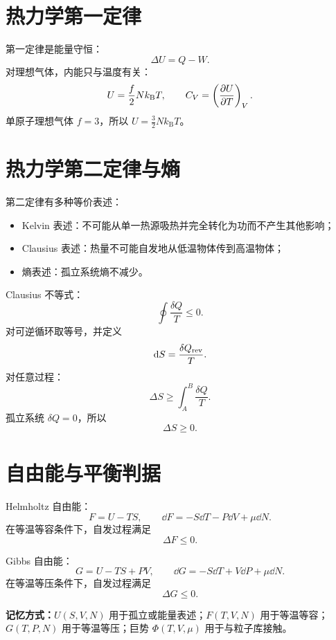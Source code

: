 \section{热力学第一定律}

第一定律是能量守恒：
\[
  \Delta U = Q-W .
\]
对理想气体，内能只与温度有关：
\[
  U = \frac{f}{2}Nk_{\mathrm B}T,\qquad C_V=\left(\frac{\partial U}{\partial T}\right)_{V}.
\]
单原子理想气体 $f=3$，所以 $U=\frac{3}{2}Nk_{\mathrm B}T$。

\section{热力学第二定律与熵}

第二定律有多种等价表述：
\begin{itemize}
  \item Kelvin 表述：不可能从单一热源吸热并完全转化为功而不产生其他影响；
  \item Clausius 表述：热量不可能自发地从低温物体传到高温物体；
  \item 熵表述：孤立系统熵不减少。
\end{itemize}

Clausius 不等式：
\[
  \oint \frac{\delta Q}{T}\le 0 .
\]
对可逆循环取等号，并定义
\[
  \mathrm{d} S = \frac{\delta Q_{\rm rev}}{T}.
\]
对任意过程：
\[
  \Delta S \ge \int_A^B\frac{\delta Q}{T}.
\]
孤立系统 $\delta Q=0$，所以
\[
  \Delta S\ge 0 .
\]

\section{自由能与平衡判据}

Helmholtz 自由能：
\[
  F = U-TS,\qquad \dd F=-S\dd T-P\dd V+\mu\dd N .
\]
在等温等容条件下，自发过程满足
\[
  \Delta F\le 0.
\]

Gibbs 自由能：
\[
  G = U-TS+PV,\qquad \dd G=-S\dd T+V\dd P+\mu\dd N .
\]
在等温等压条件下，自发过程满足
\[
  \Delta G\le 0.
\]

\begin{keybox}
\textbf{记忆方式：}$U(S,V,N)$ 用于孤立或能量表述；$F(T,V,N)$ 用于等温等容；$G(T,P,N)$ 用于等温等压；巨势 $\Phi(T,V,\mu)$ 用于与粒子库接触。
\end{keybox}

